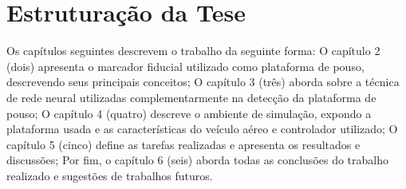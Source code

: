 

\section{Estruturação da Tese}

Os capítulos seguintes descrevem o trabalho da seguinte forma: O capítulo 2 (dois) apresenta o marcador fiducial utilizado como plataforma de pouso, descrevendo seus principais conceitos; O capítulo 3 (três) aborda sobre a técnica de rede neural utilizadas complementarmente na detecção da plataforma de pouso; O capítulo 4 (quatro) descreve o ambiente de simulação, expondo a plataforma usada e as características do veículo aéreo e controlador utilizado; O capítulo 5 (cinco) define as tarefas realizadas e apresenta os resultados e discussões; Por fim, o capítulo 6 (seis) aborda todas as conclusões do trabalho realizado e sugestões de trabalhos futuros.




